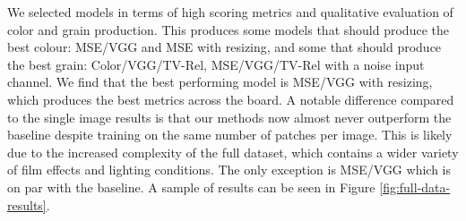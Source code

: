 We selected models in terms of high scoring metrics and qualitative evaluation of color and grain production. This produces some models that should produce the best colour: MSE/VGG and MSE with resizing, and some that should produce the best grain: Color/VGG/TV-Rel, MSE/VGG/TV-Rel with a noise input channel. We find that the best performing model is MSE/VGG with resizing, which produces the best metrics across the board. A notable difference compared to the single image results is that our methods now almost never outperform the baseline despite training on the same number of patches per image. This is likely due to the increased complexity of the full dataset, which contains a wider variety of film effects and lighting conditions. The only exception is MSE/VGG which is on par with the baseline. A sample of results can be seen in Figure \ref{fig:full-data-results}.


